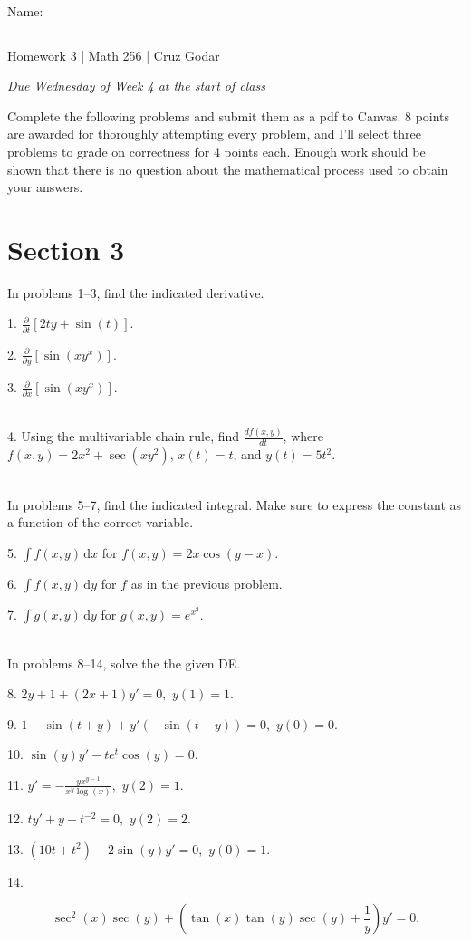 \documentclass{article}
\begin{document}
\Large Name: \rule{2in}{0.15mm} \hfill Homework 3 | Math 256 | Cruz Godar \vspace{4pt} \normalsize

\textit{Due Wednesday of Week 4 at the start of class}

Complete the following problems and submit them as a pdf to Canvas. 8 points are awarded for thoroughly attempting every problem, and I'll select three problems to grade on correctness for 4 points each. Enough work should be shown that there is no question about the mathematical process used to obtain your answers.

\section{Section 3}

In problems 1--3, find the indicated derivative.

1. $\displaystyle \frac{\partial}{\partial t} \left[ 2ty + \sin(t) \right].$

2. $\displaystyle \frac{\partial}{\partial y} \left[ \sin(xy^x) \right].$

3. $\displaystyle \frac{\partial}{\partial x} \left[ \sin(xy^x) \right].$

~\\

4. Using the multivariable chain rule, find $\displaystyle \frac{d f(x, y)}{dt}$, where $\displaystyle f(x, y) = 2x^2 + \sec(xy^2)$, $x(t) = t$, and $y(t) = 5t^2$.

~\\

In problems 5--7, find the indicated integral. Make sure to express the constant as a function of the correct variable.

5. $\displaystyle \int f(x, y)\,\text{d} x$ for $\displaystyle f(x, y) = 2x\cos(y - x).$

6. $\displaystyle \int f(x, y)\,\text{d} y$ for $f$ as in the previous problem.

7. $\displaystyle \int g(x, y)\,\text{d} y$ for $\displaystyle g(x, y) = e^{x^2}.$

~\\

In problems 8--14, solve the the given DE.

8. $\displaystyle 2y + 1 + (2x + 1)y' = 0,$ $\displaystyle y(1) = 1.$

9. $\displaystyle 1 - \sin(t + y) + y'(-\sin(t + y)) = 0,$ $\displaystyle y(0) = 0.$

10. $\displaystyle \sin(y)y' - te^t\cos(y) = 0.$

11. $\displaystyle y' = -\frac{yx^{y - 1}}{x^y\log(x)},$ $\displaystyle y(2) = 1.$

12. $\displaystyle ty' + y + t^{-2} = 0,$ $\displaystyle y(2) = 2.$

13. $\displaystyle (10t + t^2) - 2\sin(y)y' = 0,$ $\displaystyle y(0) = 1.$

14.

$$
	\sec^2(x)\sec(y) + \left( \tan(x) \tan(y) \sec(y) + \frac{1}{y} \right)y' = 0.
$$
\end{document}
